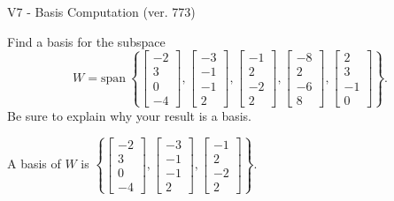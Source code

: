 \begin{exercise}
  \begin{exerciseTitle}V7 - Basis Computation (ver. 773)\end{exerciseTitle}
  \begin{exerciseStatement}
    Find a basis for the subspace 
\[W=\mathrm{span}\ \left\{\left[\begin{array}{r}
-2 \\
3 \\
0 \\
-4
\end{array}\right] , \left[\begin{array}{r}
-3 \\
-1 \\
-1 \\
2
\end{array}\right] , \left[\begin{array}{r}
-1 \\
2 \\
-2 \\
2
\end{array}\right] , \left[\begin{array}{r}
-8 \\
2 \\
-6 \\
8
\end{array}\right] , \left[\begin{array}{r}
2 \\
3 \\
-1 \\
0
\end{array}\right]\right\}.\]
 Be sure to explain why your result is a basis.


  \end{exerciseStatement}
  \begin{exerciseAnswer}
   A basis of \(W\) is  \(\left\{\left[\begin{array}{r}
-2 \\
3 \\
0 \\
-4
\end{array}\right] , \left[\begin{array}{r}
-3 \\
-1 \\
-1 \\
2
\end{array}\right] , \left[\begin{array}{r}
-1 \\
2 \\
-2 \\
2
\end{array}\right]\right\}\).
  


  \end{exerciseAnswer}
\end{exercise}